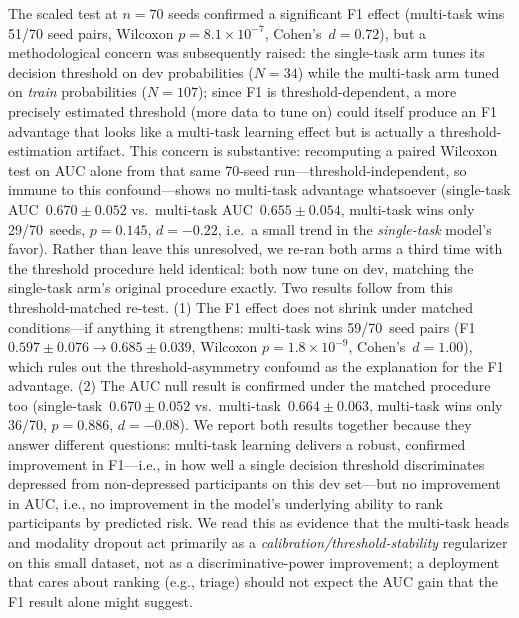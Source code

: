 \documentclass[5p,twocolumn]{elsarticle}
\begin{document}
The scaled test at $n{=}70$ seeds confirmed a significant F1 effect
(multi-task wins 51/70 seed pairs, Wilcoxon $p{=}8.1{\times}10^{-7}$,
Cohen's~$d{=}0.72$), but a methodological concern was subsequently
raised: the single-task arm tunes its decision threshold on dev
probabilities ($N{=}34$) while the multi-task arm tuned on
\emph{train} probabilities ($N{=}107$); since F1 is
threshold-dependent, a more precisely estimated threshold (more data
to tune on) could itself produce an F1 advantage that looks like a
multi-task learning effect but is actually a threshold-estimation
artifact. This concern is substantive: recomputing a paired Wilcoxon
test on AUC alone from that same 70-seed run---threshold-independent,
so immune to this confound---shows no multi-task advantage
whatsoever (single-task AUC~$0.670\pm0.052$ vs.\ multi-task
AUC~$0.655\pm0.054$, multi-task wins only 29/70~seeds, $p{=}0.145$,
$d{=}-0.22$, i.e.\ a small trend in the \emph{single-task} model's
favor). Rather than leave this unresolved, we re-ran both arms a
third time with the threshold procedure held identical: both now
tune on dev, matching the single-task arm's original procedure
exactly. Two results follow from this threshold-matched re-test. (1)
The F1 effect does not shrink under matched conditions---if anything
it strengthens: multi-task wins 59/70~seed pairs
(F1~$0.597\pm0.076\to0.685\pm0.039$, Wilcoxon
$p{=}1.8{\times}10^{-9}$, Cohen's~$d{=}1.00$), which rules out the
threshold-asymmetry confound as the explanation for the F1 advantage.
(2) The AUC null result is confirmed under the matched procedure too
(single-task~$0.670\pm0.052$ vs.\ multi-task~$0.664\pm0.063$,
multi-task wins only 36/70, $p{=}0.886$, $d{=}-0.08$). We report both
results together because they answer different questions: multi-task
learning delivers a robust, confirmed improvement in F1---i.e., in
how well a single decision threshold discriminates depressed from
non-depressed participants on this dev set---but no improvement in
AUC, i.e., no improvement in the model's underlying ability to rank
participants by predicted risk. We read this as evidence that the
multi-task heads and modality dropout act primarily as a
\emph{calibration/threshold-stability} regularizer on this small
dataset, not as a discriminative-power improvement; a deployment that
cares about ranking (e.g., triage) should not expect the AUC gain
that the F1 result alone might suggest.
\end{document}
